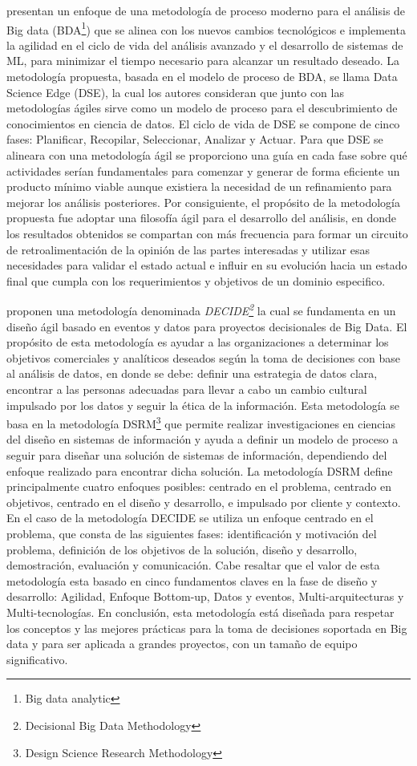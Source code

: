 \cite{Grady2017} presentan un enfoque de una metodología de proceso moderno para el análisis de Big data (BDA\footnote{Big data analytic}) que se alinea con los nuevos cambios tecnológicos e implementa la agilidad en el ciclo de vida del análisis avanzado y el desarrollo de sistemas de ML, para minimizar el tiempo necesario para alcanzar un resultado deseado. La metodología propuesta, basada en el modelo de proceso de BDA, se llama Data Science Edge (DSE), la cual los autores consideran que junto con las metodologías ágiles sirve como un modelo de proceso para el descubrimiento de conocimientos en ciencia de datos. El ciclo de vida de DSE se compone de cinco fases: Planificar, Recopilar, Seleccionar, Analizar y Actuar. Para que DSE se alineara con una metodología ágil se proporciono una guía en cada fase sobre qué actividades serían fundamentales para comenzar y generar de forma eficiente un producto mínimo viable aunque existiera la necesidad de un refinamiento para mejorar los análisis posteriores. Por consiguiente, el propósito de la metodología propuesta fue adoptar una filosofía ágil para el desarrollo del análisis, en donde los resultados obtenidos se compartan con más frecuencia para formar un circuito de retroalimentación de la opinión de las partes interesadas y utilizar esas necesidades para validar el estado actual e influir en su evolución hacia un estado final que cumpla con los requerimientos y objetivos de un dominio especifico.

\cite{Sfaxi2020} proponen una metodología denominada \textit{DECIDE\footnote{Decisional Big Data Methodology}} la cual se fundamenta en un diseño ágil basado en eventos y datos para proyectos decisionales de Big Data. El propósito de esta metodología es ayudar a las organizaciones a determinar los objetivos comerciales y analíticos deseados según la toma de decisiones con base al análisis de datos, en donde se debe: definir una estrategia de datos clara, encontrar a las personas adecuadas para llevar a cabo un cambio cultural impulsado por los datos y seguir la ética de la información. Esta metodología se basa en la  metodología DSRM\footnote{Design Science Research Methodology} que permite realizar investigaciones en ciencias del diseño en sistemas de información y ayuda a definir un modelo de proceso a seguir para diseñar una solución de sistemas de información, dependiendo del enfoque realizado para encontrar dicha solución. La metodología DSRM define principalmente cuatro enfoques posibles: centrado en el problema, centrado en objetivos, centrado en el diseño y desarrollo, e impulsado por cliente y contexto. En el caso de la metodología DECIDE se utiliza un enfoque centrado en el problema, que consta de las siguientes fases: identificación y motivación del problema, definición de los objetivos de la solución, diseño y desarrollo, demostración, evaluación y comunicación. Cabe resaltar que el valor de esta metodología esta basado en cinco fundamentos claves en la fase de diseño y desarrollo: Agilidad, Enfoque Bottom-up, Datos y eventos, Multi-arquitecturas y Multi-tecnologías. En conclusión, esta metodología está diseñada para respetar los conceptos y las mejores prácticas para la toma de decisiones soportada en Big data y para ser aplicada a grandes proyectos, con un tamaño de equipo significativo. 

